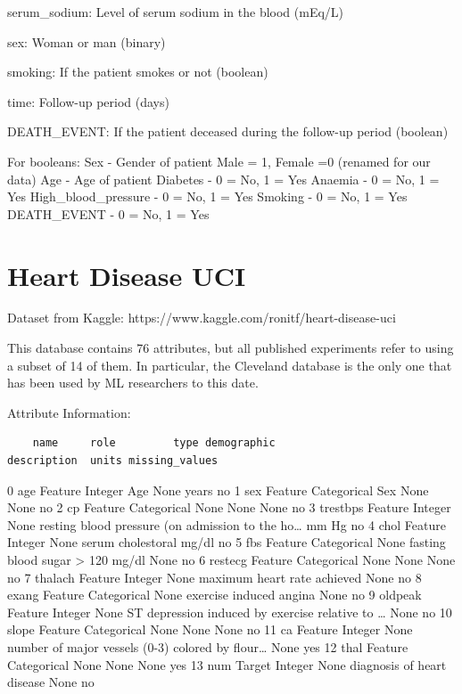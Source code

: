 \documentclass[
  letterpaper,
]{krantz}
\begin{document}
serum\_sodium: Level of serum sodium in the blood (mEq/L)

sex: Woman or man (binary)

smoking: If the patient smokes or not (boolean)

time: Follow-up period (days)

DEATH\_EVENT: If the patient deceased during the follow-up period
(boolean)

For booleans: Sex - Gender of patient Male = 1, Female =0 (renamed for
our data) Age - Age of patient Diabetes - 0 = No, 1 = Yes Anaemia - 0 =
No, 1 = Yes High\_blood\_pressure - 0 = No, 1 = Yes Smoking - 0 = No, 1
= Yes DEATH\_EVENT - 0 = No, 1 = Yes

\section{Heart Disease UCI}\label{sec-dd-heart-disease-uci}

Dataset from Kaggle: https://www.kaggle.com/ronitf/heart-disease-uci

This database contains 76 attributes, but all published experiments
refer to using a subset of 14 of them. In particular, the Cleveland
database is the only one that has been used by ML researchers to this
date.

Attribute Information:

\begin{verbatim}
    name     role         type demographic                                        description  units missing_values
\end{verbatim}

0 age Feature Integer Age None years no 1 sex Feature Categorical Sex
None None no 2 cp Feature Categorical None None None no 3 trestbps
Feature Integer None resting blood pressure (on admission to the
ho\ldots{} mm Hg no 4 chol Feature Integer None serum cholestoral mg/dl
no 5 fbs Feature Categorical None fasting blood sugar \textgreater{} 120
mg/dl None no 6 restecg Feature Categorical None None None no 7 thalach
Feature Integer None maximum heart rate achieved None no 8 exang Feature
Categorical None exercise induced angina None no 9 oldpeak Feature
Integer None ST depression induced by exercise relative to \ldots{} None
no 10 slope Feature Categorical None None None no 11 ca Feature Integer
None number of major vessels (0-3) colored by flour\ldots{} None yes 12
thal Feature Categorical None None None yes 13 num Target Integer None
diagnosis of heart disease None no
\end{document}
